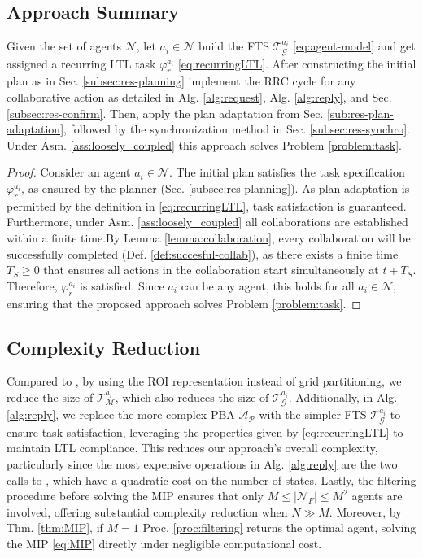 \subsection{Approach Summary}
\begin{theorem}
    Given the set of agents $\mathcal{N}$, let $a_i\in\mathcal{N}$ build the FTS $\mathcal{T}^{a_i}_{\mathcal{G}}$ \eqref{eq:agent-model} and get assigned a recurring LTL task $\varphi^{a_i}_r$ \eqref{eq:recurringLTL}. After constructing the initial plan as in Sec. \ref{subsec:res-planning} implement the  RRC cycle for any collaborative action as detailed in Alg. \ref{alg:request}, Alg. \ref{alg:reply}, and  Sec. \ref{subsec:res-confirm}.
    Then, apply the plan adaptation from Sec. \ref{sub:res-plan-adaptation}, followed by the synchronization method in Sec. \ref{subsec:res-synchro}. Under Asm. \ref{ass:loosely_coupled} this approach solves Problem \ref{problem:task}.
\end{theorem}
\begin{proof}
Consider an agent $a_i \in \mathcal{N}$. The initial plan satisfies the task specification $\varphi^{a_i}_r$, as ensured by the planner (Sec. \ref{subsec:res-planning}). 
As plan adaptation is permitted by the definition in \eqref{eq:recurringLTL}, task satisfaction is guaranteed. Furthermore, under Asm. \ref{ass:loosely_coupled} all collaborations are established within a finite time.By Lemma \ref{lemma:collaboration}, every collaboration will be successfully completed (Def. \ref{def:succesful-collab}), as there exists a finite time $T_S \geq 0$ that ensures all actions in the collaboration start simultaneously at $t + T_S$. Therefore, $\varphi^{a_i}_r$ is satisfied. Since $a_i$ can be any agent, this holds for all $a_i \in \mathcal{N}$, ensuring that the proposed approach solves Problem \ref{problem:task}.
\end{proof}
\subsection{Complexity Reduction}\label{subsec:res-complexity}
Compared to \cite{meng_paper}, by using the ROI representation instead of grid partitioning, we reduce the size of $\mathcal{T}^{a_i}_{\mathcal{M}}$, which also reduces the size of $\mathcal{T}^{a_i}_{\mathcal{G}}$. Additionally, in Alg. \ref{alg:reply}, we replace the more complex PBA $\mathcal{A_P}$ with the simpler FTS $\mathcal{T}^{a_i}_{\mathcal{G}}$ to ensure task satisfaction, leveraging the properties given by \eqref{eq:recurringLTL} to maintain LTL compliance. This reduces our approach's overall complexity, particularly since the most expensive operations in Alg. \ref{alg:reply} are the two calls to \Dijkstra, which have a quadratic cost on the number of states. Lastly, the filtering procedure before solving the MIP ensures that only $M \leq |\mathcal{N}_F| \leq M^2$ agents are involved, offering substantial complexity reduction when $N \gg M$. Moreover, by Thm. \ref{thm:MIP}, if $M=1$ Proc. \ref{proc:filtering} returns the optimal agent, solving  the MIP \eqref{eq:MIP} directly under negligible computational cost.

